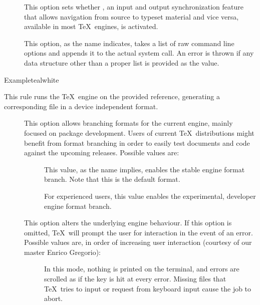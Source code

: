 \begin{description}
\begin{description}
\item[] This option sets whether , an input and output synchronization feature that allows navigation from source to typeset material and vice versa, available in most \TeX\ engines, is activated.

\item[] This option, as the name indicates, takes a list of raw command line options and appends it to the actual system call. An error is thrown if any data structure other than a proper list is provided as the value.
\end{description}

\begin{codebox}{Example}{teal}{\icnote}{white}
\end{codebox}

\item[\rulebox{platex}]
This rule runs the  \TeX\ engine on the provided  reference, generating a corresponding file in a device independent format.

\begin{description}
\item[] This option allows branching formats for the current engine, mainly focused on package development. Users of current \TeX\ distributions might benefit from format branching in order to easily test documents and code against the upcoming releases. Possible values are:

\begin{description}
\item[] This value, as the name implies, enables the stable engine format branch. Note that this is the default format.

\item[] For experienced users, this value enables the experimental, developer engine format branch.
\end{description}

\item[] This option alters the underlying engine behaviour. If this option is omitted, \TeX\ will prompt the user for interaction in the event of an error. Possible values are, in order of increasing user interaction (courtesy of our master Enrico Gregorio):

\begin{description}
\item[] In this mode, nothing is printed on the terminal, and errors are scrolled as if the  key is hit at every error. Missing files that \TeX\ tries to input or request from keyboard input cause the job to abort.


\end{description}
\end{description}
\end{description}
